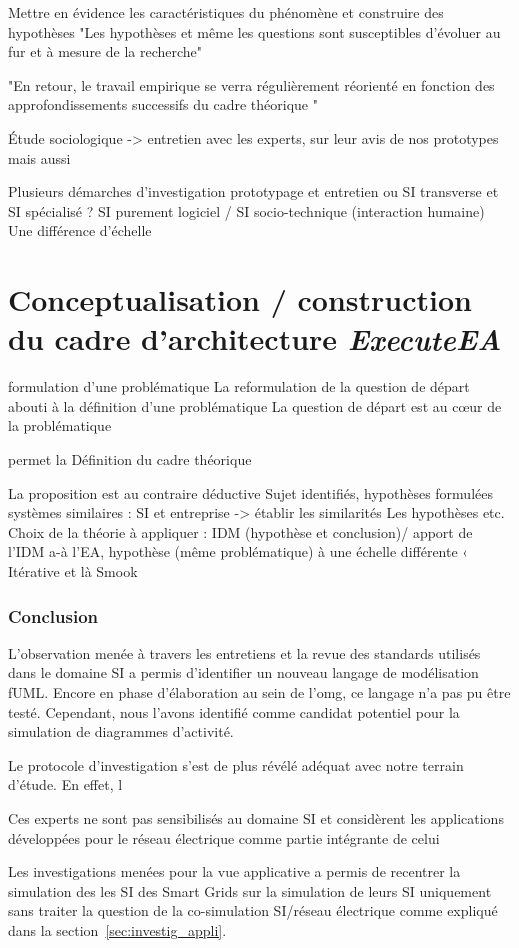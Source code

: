 Mettre en évidence les caractéristiques du phénomène et construire des 
hypothèses 
"Les hypothèses et même les questions sont susceptibles d'évoluer au fur et à 
mesure de la recherche"

"En retour, le travail empirique se verra régulièrement réorienté en fonction 
des approfondissements successifs du cadre théorique "

Étude sociologique -> entretien avec les experts, sur leur avis de nos 
prototypes mais aussi 

Plusieurs démarches d'investigation 
prototypage et entretien 
ou SI transverse et SI spécialisé ? SI purement logiciel / SI socio-technique 
(interaction humaine) 
Une différence d'échelle 
		 


	\section{Conceptualisation / construction du cadre d'architecture 
\textit{ExecuteEA}}
formulation d'une problématique 
La reformulation de la question de départ abouti à la définition d'une 
problématique 
La question de départ est au cœur de la problématique 

permet la Définition du cadre théorique 

La proposition est au contraire déductive
Sujet identifiés, hypothèses formulées
systèmes similaires : SI et entreprise -> établir les similarités
Les hypothèses etc.  
Choix de la théorie à appliquer : IDM (hypothèse et conclusion)/ apport de l'IDM 
a-à l'EA, hypothèse (même problématique) à une échelle différente  ‹
Itérative et là Smook 

	\subsubsection{Conclusion}
	

L'observation menée à travers les entretiens et la revue des standards utilisés dans le domaine SI a permis d'identifier un nouveau langage de modélisation fUML. Encore en phase d'élaboration au sein de l'\gls{omg}, ce langage n'a pas pu être testé. Cependant, nous l'avons identifié comme candidat potentiel pour la simulation de diagrammes d'activité.

Le protocole d'investigation s'est de plus révélé adéquat avec notre terrain d'étude. En effet, l

Ces experts ne sont pas sensibilisés au domaine SI et considèrent les applications développées pour le réseau électrique comme partie intégrante de celui 

Les investigations menées pour la vue applicative a permis de recentrer la simulation des les SI des Smart Grids sur la simulation de leurs SI uniquement sans traiter la question de la co-simulation SI/réseau électrique comme expliqué dans la section~\ref{sec:investig_appli}. 
	

